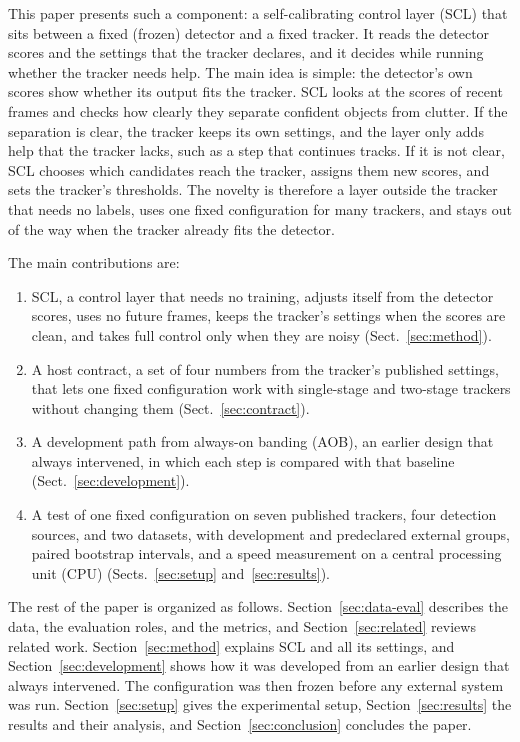 \documentclass[pdflatex,sn-mathphys-num,iicol]{sn-jnl}
\newcommand{\scl}{SCL}
\newcommand{\aob}{AOB}
\begin{document}
This paper presents such a component: a self-calibrating control layer (\scl{})
that sits between a fixed (frozen) detector and a fixed tracker. It reads the
detector scores and the settings that the tracker declares, and it decides
while running whether the tracker needs help. The main idea is simple: the
detector's own scores show whether its output fits the tracker. \scl{} looks
at the scores of recent frames and checks how clearly they separate confident
objects from clutter. If the separation is clear, the tracker keeps its own
settings, and the layer only adds help that the tracker lacks, such as a step
that continues tracks. If it is not clear, \scl{} chooses which candidates
reach the tracker, assigns them new scores, and sets the tracker's thresholds.
The novelty is therefore a layer outside the tracker that needs no labels,
uses one fixed configuration for many trackers, and stays out of the way when
the tracker already fits the detector.

The main contributions are:
\begin{enumerate}
\item \scl{}, a control layer that needs no training, adjusts itself from the
      detector scores, uses no future frames, keeps the tracker's settings
      when the scores are clean, and takes full control only when they are
      noisy (Sect.~\ref{sec:method}).
\item A host contract, a set of four numbers from the tracker's published
      settings, that lets one fixed configuration work with single-stage and
      two-stage trackers without changing them (Sect.~\ref{sec:contract}).
\item A development path from always-on banding (\aob{}), an earlier design
      that always intervened, in which each step is compared with that
      baseline (Sect.~\ref{sec:development}).
\item A test of one fixed configuration on seven published trackers, four
      detection sources, and two datasets, with development and predeclared
      external groups, paired bootstrap intervals, and a speed measurement on
      a central processing unit (CPU) (Sects.~\ref{sec:setup} and~\ref{sec:results}).
\end{enumerate}

The rest of the paper is organized as follows. Section~\ref{sec:data-eval}
describes the data, the evaluation roles, and the metrics, and
Section~\ref{sec:related} reviews related work. Section~\ref{sec:method}
explains \scl{} and all its settings, and Section~\ref{sec:development} shows
how it was developed from an earlier design that always intervened. The
configuration was then frozen before any external system was run.
Section~\ref{sec:setup} gives the experimental setup,
Section~\ref{sec:results} the results and their analysis, and
Section~\ref{sec:conclusion} concludes the paper.
\end{document}
